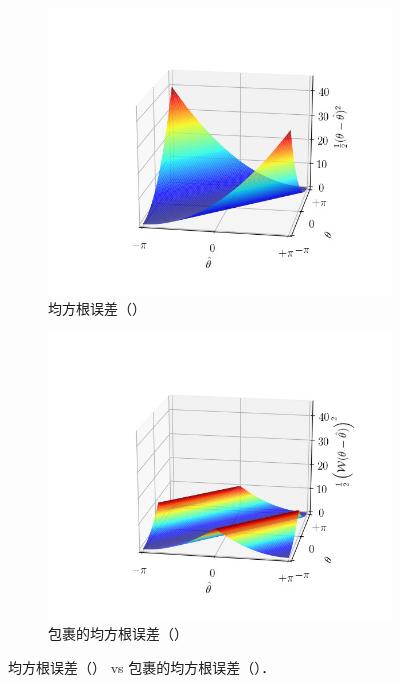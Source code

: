 \renewcommand{\captiontitle}{均方根误差（\MSE{}） vs 包裹的均方根误差（\MSWE{}）}
\begin{figure}
\begin{center}
\begin{subfigure}{0.48\textwidth}
\includegraphics[clip, trim=90 30 50 70,width=1.0\textwidth]{./data/phase-loss.png}
\caption{均方根误差（\MSE{}）}
\end{subfigure}
\begin{subfigure}{0.48\textwidth}
\includegraphics[clip, trim=90 30 50 70,width=1.0\textwidth]{./data/wrapped-phase-loss.png}
\caption{包裹的均方根误差（\MSWE{}）}
\end{subfigure}
\caption[\captiontitle]{\captiontitle{}．}
\label{fig:wrapped-phase-loss}
\end{center}
\end{figure}

